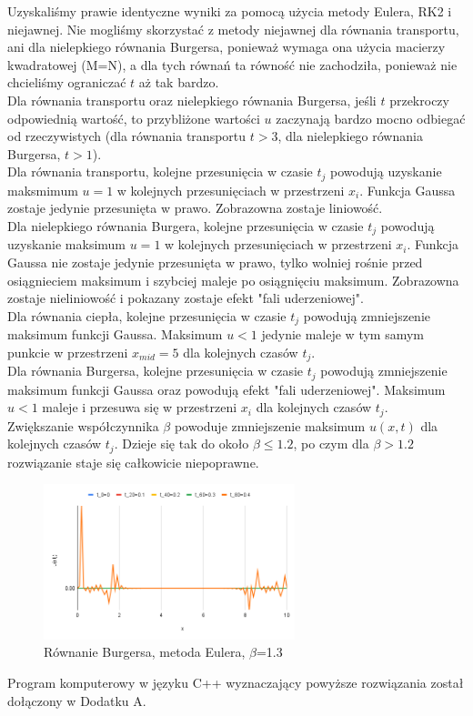 \documentclass[12pt, a4paper]{article}
\begin{document}
Uzyskaliśmy prawie identyczne wyniki za pomocą użycia metody Eulera, RK2 i niejawnej. Nie mogliśmy skorzystać z metody niejawnej dla równania transportu, ani dla nielepkiego równania Burgersa, ponieważ wymaga ona użycia macierzy kwadratowej (M=N), a dla tych równań ta równość nie zachodziła, ponieważ nie chcieliśmy ograniczać $t$ aż tak bardzo.\\

Dla równania transportu oraz nielepkiego równania Burgersa, jeśli $t$ przekroczy odpowiednią wartość, to przybliżone wartości $u$ zaczynają bardzo mocno odbiegać od rzeczywistych (dla równania transportu $t>3$, dla nielepkiego równania Burgersa, $t>1$).\\

Dla równania transportu, kolejne przesunięcia w czasie $t_{j}$ powodują uzyskanie maksmimum $u=1$ w kolejnych przesunięciach w przestrzeni $x_{i}$.  Funkcja Gaussa zostaje jedynie przesunięta w prawo.  Zobrazowna zostaje liniowość.\\

Dla nielepkiego równania Burgera, kolejne przesunięcia w czasie $t_{j}$ powodują uzyskanie maksimum $u=1$ w kolejnych przesunięciach w przestrzeni $x_{i}$. Funkcja Gaussa nie zostaje jedynie przesunięta w prawo, tylko wolniej rośnie przed osiągnieciem maksimum i szybciej maleje po osiągnięciu maksimum. Zobrazowna zostaje nieliniowość i pokazany zostaje efekt "fali uderzeniowej".\\

Dla równania ciepła, kolejne przesunięcia w czasie $t_{j}$ powodują zmniejszenie maksimum funkcji Gaussa. Maksimum $u<1$ jedynie maleje w tym samym punkcie w przestrzeni $x_{mid}=5$ dla kolejnych czasów $t_{j}$.\\ 

Dla równania Burgersa, kolejne przesunięcia w czasie $t_{j}$ powodują zmniejszenie maksimum funkcji Gaussa oraz powodują efekt "fali uderzeniowej". Maksimum $u<1$ maleje i przesuwa się w przestrzeni $x_{i}$ dla kolejnych czasów $t_{j}$.\\

Zwiększanie współczynnika $\beta$ powoduje zmniejszenie maksimum $u(x,t)$ dla kolejnych czasów $t_{j}$. Dzieje się tak do około $\beta\leqslant1.2$, po czym dla  $\beta>1.2$ rozwiązanie staje się całkowicie niepoprawne.\\
\begin{figure}[h]
\caption{Równanie Burgersa, metoda Eulera, $\beta$=1.3}
\centering
\includegraphics[width=0.65\textwidth]{10}
\end{figure}

Program komputerowy w języku C++ wyznaczający powyższe rozwiązania został dołączony w Dodatku A.
\end{document}
